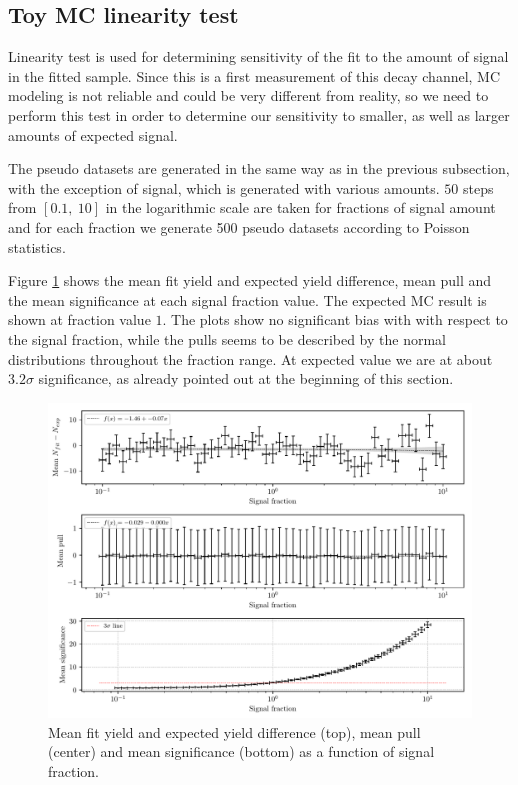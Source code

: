 \subsection{Toy MC linearity test}
Linearity test is used for determining sensitivity of the fit to the amount of signal in the fitted sample. Since this is a first measurement of this decay channel, MC modeling is not reliable and could be very different from reality, so we need to perform this test in order to determine our sensitivity to smaller, as well as larger amounts of expected signal.

The pseudo datasets are generated in the same way as in the previous subsection, with the exception of signal, which is generated with various amounts. $50$ steps from $[0.1,~10]$ in the logarithmic scale are taken for fractions of signal amount and for each fraction we generate 500 pseudo datasets according to Poisson statistics.

Figure \ref{fig:lin_test} shows the mean fit yield and expected yield difference, mean pull and the mean significance at each signal fraction value. The expected MC result is shown at fraction value $1$. The plots show no significant bias with with respect to the signal fraction, while the pulls seems to be described by the normal distributions throughout the fraction range. At expected value we are at about $3.2\sigma$ significance, as already pointed out at the beginning of this section.

\begin{figure}[H]
	\centering
	\captionsetup{width=0.8\linewidth}
	\includegraphics[width=\linewidth]{fig/lin_test}
	\caption{Mean fit yield and expected yield difference (top), mean pull (center) and mean significance (bottom) as a function of signal fraction.}
	\label{fig:lin_test}
\end{figure}

